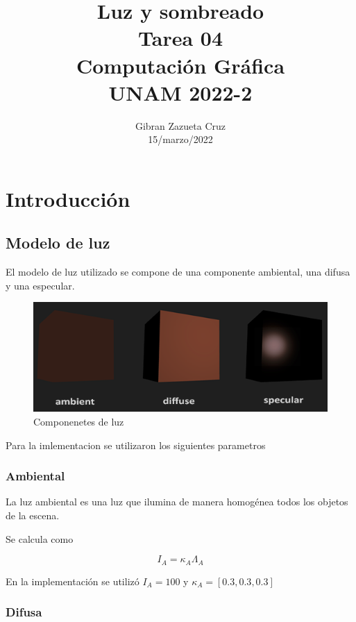\documentclass[12pt]{article}
\title{%
  Luz y sombreado\\
  \large Tarea 04 \\
    \Large Computación Gráfica\\
     \large UNAM 2022-2}
\author{Gibran Zazueta Cruz \\
\small 15/marzo/2022}
\date{}
\begin{document}
\maketitle

\section{Introducción}


\subsection{Modelo de luz}

El modelo de luz utilizado se compone de una componente ambiental, una difusa y una especular.

\begin{figure}[H]
\centering
\includegraphics[scale=0.5]{images/lighting.png}
\caption{Componenetes de luz \cite{open}}
\end{figure}



Para la imlementacion se utilizaron los siguientes parametros

\subsubsection{Ambiental}

La luz ambiental es una luz que ilumina de manera homogénea todos los objetos de la escena.

Se calcula como

\begin{equation}
I_{A}=\kappa_{A}\Lambda_{A}
\end{equation}

En la implementación se utilizó $I_{A}=100$ y $\kappa_{A}=[0.3,0.3,0.3]$

\subsubsection{Difusa}
\end{document}
